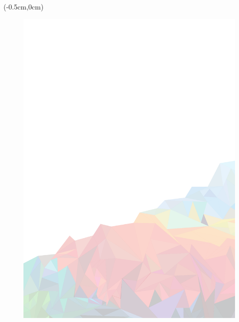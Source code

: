 \begin{textblock*}{5cm}(-0.5cm,0cm) %
   \begin{figure}[]
		\includegraphics[width=22cm]{images/PageCover.pdf}
	\end{figure}
\end{textblock*}


\newpage